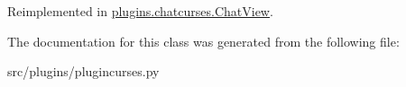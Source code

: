 \-Reimplemented in \hyperlink{classplugins_1_1chatcurses_1_1_chat_view_a96c4c19690f0c756a121226ce681eb03}{plugins.\-chatcurses.\-Chat\-View}.



\-The documentation for this class was generated from the following file\-:\begin{DoxyCompactItemize}
\item 
src/plugins/plugincurses.\-py\end{DoxyCompactItemize}
